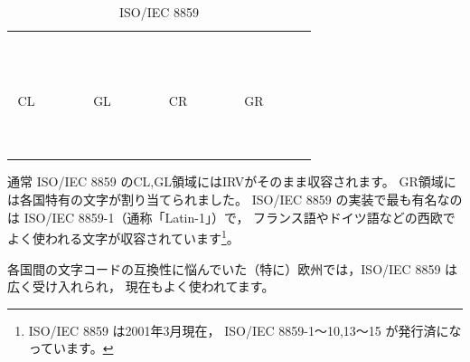 \documentclass[a4j,10pt,fleqn,uplatex]{jsarticle}
\begin{document}
\begin{table}[htp]
\begin{center}\begin{tabular}{|cc|cccccc|cc|cccccc|}
    \hline
       &   & \multicolumn{1}{c|}{\footnotesize{~}} &   &   &   &   &   &   &   & \multicolumn{1}{c|}{\footnotesize{~}} &   &   &   &   &   \\ \cline{3-3} \cline{11-11}
     ~ & ~ & ~ & ~ & ~ & ~ & ~ & ~ & ~ & ~ & ~ & ~ & ~ & ~ & ~ & ~ \\
       &   &   &   &   &   &   &   &   &   &   &   &   &   &   &   \\
       &   &   &   &   &   &   &   &   &   &   &   &   &   &   &   \\
       &   &   &   &   &   &   &   &   &   &   &   &   &   &   &   \\
    \multicolumn{2}{|c|}{\footnotesize{CL}} &  \multicolumn{6}{c|}{\footnotesize{GL}} & \multicolumn{2}{c|}{\footnotesize{CR}} & \multicolumn{6}{c|}{\footnotesize{GR}} \\
       &   &   &   &   &   &   &   &   &   &   &   &   &   &   &   \\
       &   &   &   &   &   &   &   &   &   &   &   &   &   &   &   \\
       &   &   &   &   &   &   &   &   &   &   &   &   &   &   &   \\
       &   &   &   &   &   &   &   &   &   &   &   &   &   &   &   \\
       &   &   &   &   &   &   &   &   &   &   &   &   &   &   &   \\  \cline{8-8} \cline{16-16}
       &   &   &   &   &   &   & \multicolumn{1}{|c|}{\footnotesize{~}}  &   &   &   &   &   &   &   & \multicolumn{1}{|c|}{\footnotesize{~}} \\
    \hline
\end{tabular}\end{center}
\caption{ISO/IEC 8859} \label{tbl:ISO8859}
\end{table}

通常 ISO/IEC 8859 のCL,GL領域にはIRVがそのまま収容されます。
GR領域には各国特有の文字が割り当てられました。
ISO/IEC 8859 の実装で最も有名なのは ISO/IEC 8859-1（通称「Latin-1」）で，
フランス語やドイツ語などの西欧でよく使われる文字が収容されています\footnote{
    ISO/IEC 8859 は2001年3月現在，
    ISO/IEC 8859-1～10,13～15 が発行済になっています。
}。

各国間の文字コードの互換性に悩んでいた（特に）欧州では，ISO/IEC 8859 は広く受け入れられ，
現在もよく使われてます。
\end{document}
